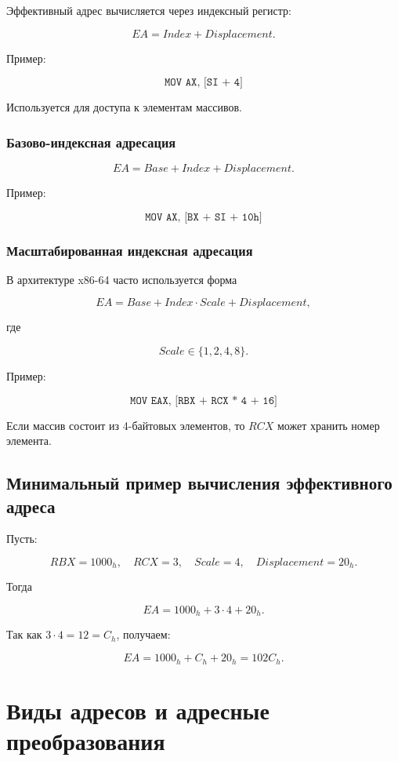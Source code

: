 \documentclass[a4paper,12pt]{article}
\begin{document}
Эффективный адрес вычисляется через индексный регистр:

\[
EA = Index + Displacement.
\]

Пример:

\[
\texttt{MOV AX, [SI + 4]}
\]

Используется для доступа к элементам массивов.

\subsubsection{Базово-индексная адресация}

\[
EA = Base + Index + Displacement.
\]

Пример:

\[
\texttt{MOV AX, [BX + SI + 10h]}
\]

\subsubsection{Масштабированная индексная адресация}

В архитектуре x86-64 часто используется форма

\[
EA = Base + Index \cdot Scale + Displacement,
\]

где

\[
Scale \in \{1, 2, 4, 8\}.
\]

Пример:

\[
\texttt{MOV EAX, [RBX + RCX * 4 + 16]}
\]

Если массив состоит из 4-байтовых элементов, то $RCX$ может хранить номер элемента.

\subsection{Минимальный пример вычисления эффективного адреса}

Пусть:

\[
RBX = 1000_h,\quad RCX = 3,\quad Scale = 4,\quad Displacement = 20_h.
\]

Тогда

\[
EA = 1000_h + 3 \cdot 4 + 20_h.
\]

Так как $3 \cdot 4 = 12 = C_h$, получаем:

\[
EA = 1000_h + C_h + 20_h = 102C_h.
\]

\section{Виды адресов и адресные преобразования}
\end{document}

